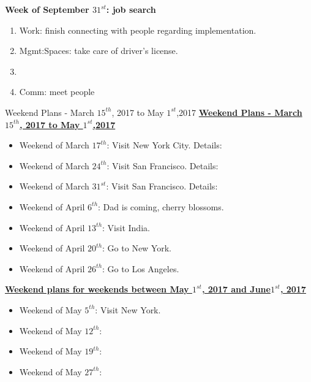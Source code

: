 \begin{columns}
\begin{column}{0.333\columnwidth}
\begin{columns}
\begin{column}{0.5\columnwidth}
\begin{block}{\small \bf Week of September $31^{st}$: job search}
\begin{enumerate}
\tiny \item \tiny Work: finish connecting with people regarding implementation. 
\item \tiny Mgmt:Spaces: take care of driver's license. 
\item \tiny 
\item \tiny Comm: meet people 
\end{enumerate}

\ifdefined\POSTER
\end{block}
\fi

\ifdefined\POSTER
\begin{block}{Weekend Plans - March $15^{th}$, 2017 to May $1^{st}$,2017} 
\else
{\underline{\bf Weekend Plans - March $15^{th}$, 2017 to May $1^{st}$,2017}}\\ 
\fi
\begin{itemize}
\item \tiny Weekend of March $17^{th}$: Visit New York City. Details:
\item \tiny Weekend of March $24^{th}$: Visit San Francisco. Details:
\item \tiny Weekend of March $31^{st}$: Visit San Francisco. Details:
\item \tiny Weekend of April $6^{th}$:  Dad is coming, cherry
  blossoms.
\item \tiny Weekend of April $13^{th}$: Visit India.
\item \tiny Weekend of April $20^{th}$: Go to New York.
\item \tiny Weekend of April $26^{th}$: Go to Los Angeles.
\end{itemize}

{\underline{\bf  Weekend plans for weekends between May $1^{st}$, 2017
    and June$1^{st}$, 2017}}\\
\begin{itemize}
\item \tiny Weekend of May $5^{th}$: Visit New York.
\item \tiny Weekend of May $12^{th}$:
\item \tiny Weekend of May $19^{th}$:
\item \tiny Weekend of May $27^{th}$:
\end{itemize}

\ifdefined\POSTER
\end{block}
\end{column}
\fi



\end{columns}
\end{column}
\end{columns}
